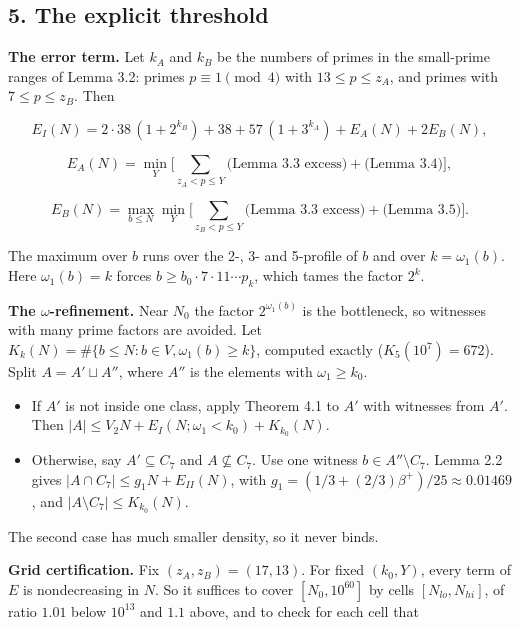 \documentclass[
  11pt,
]{article}
\providecommand{\tightlist}{%
  \setlength{\itemsep}{0pt}\setlength{\parskip}{0pt}}
\begin{document}
\subsection{5. The explicit threshold}

\textbf{The error term.} Let \(k_A\) and \(k_B\) be the numbers of
primes in the small-prime ranges of Lemma 3.2: primes
\(p \equiv 1 \pmod{4}\) with \(13 \le p \le z_A\), and primes with
\(7 \le p \le z_B\). Then

\[E_I(N) = 2\cdot 38\,(1+2^{k_B}) + 38 + 57\,(1+3^{k_A}) + E_A(N) + 2E_B(N),\]

\[E_A(N)=\min_Y\Big[\sum_{z_A<p\le Y}\text{(Lemma 3.3 excess)} + \text{(Lemma 3.4)}\Big],\]

\[E_B(N)=\max_{b\le N}\min_Y\Big[\sum_{z_B<p\le Y}\text{(Lemma 3.3 excess)} + \text{(Lemma 3.5)}\Big].\]

The maximum over \(b\) runs over the 2-, 3- and 5-profile of \(b\) and
over \(k = \omega_1(b)\). Here \(\omega_1(b) = k\) forces
\(b \ge b_0\cdot 7\cdot 11\cdots p_k\), which tames the factor \(2^k\).

\textbf{The \(\omega\)-refinement.} Near \(N_0\) the factor
\(2^{\omega_1(b)}\) is the bottleneck, so witnesses with many prime
factors are avoided. Let
\(K_k(N) = \#\{b \le N : b \in V, \omega_1(b) \ge k\}\), computed
exactly (\(K_5(10^{7}) = 672\)). Split \(A = A' \sqcup A''\), where
\(A''\) is the elements with \(\omega_1 \ge k_0\).

\begin{itemize}
\tightlist
\item
  If \(A'\) is not inside one class, apply Theorem 4.1 to \(A'\) with
  witnesses from \(A'\). Then
  \(|A| \le V_2N + E_I(N; \omega_1 < k_0) + K_{k_0}(N)\).
\item
  Otherwise, say \(A' \subseteq C_7\) and \(A \not\subseteq C_7\). Use
  one witness \(b \in A'' \setminus C_7\). Lemma 2.2 gives
  \(|A \cap C_7| \le g_1N + E_{II}(N)\), with
  \(g_1 = (1/3 + (2/3)\beta^{+})/25 \approx 0.01469\), and
  \(|A \setminus C_7| \le K_{k_0}(N)\).
\end{itemize}

The second case has much smaller density, so it never binds.

\textbf{Grid certification.} Fix \((z_A, z_B) = (17, 13)\). For fixed
\((k_0, Y)\), every term of \(E\) is nondecreasing in \(N\). So it
suffices to cover \([N_0, 10^{60}]\) by cells \([N_{lo}, N_{hi}]\), of
ratio \(1.01\) below \(10^{13}\) and \(1.1\) above, and to check for
each cell that
\end{document}

